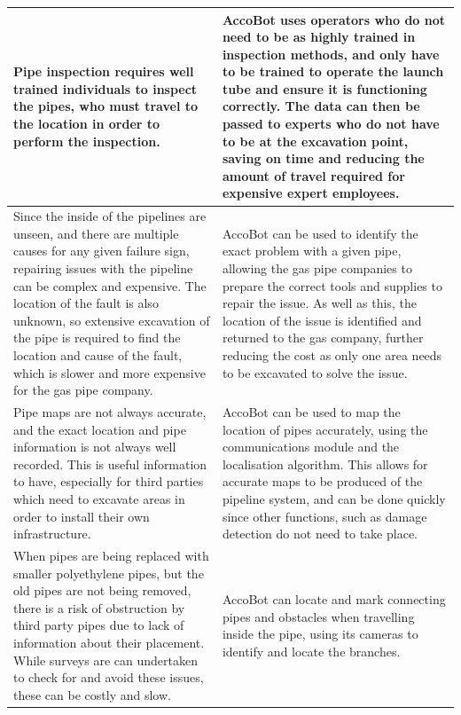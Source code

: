 \documentclass[11pt]{article}		%
\begin{document}
\begin{longtable}[c]{| m{} | m{} |}
			\\
			\hline
			\rowcolor{rowGrey}
			Pipe inspection requires well trained individuals to inspect the pipes, who must travel to the location in order to perform the inspection.
			& 
			AccoBot uses operators who do not need to be as highly trained in inspection methods, and only have to be trained to operate the launch tube and ensure it is functioning correctly.
			The data can then be passed to experts who do not have to be at the excavation point, saving on time and reducing the amount of travel required for expensive expert employees.
			\\
			\hline
			\rowcolor{rowGrey}
			Since the inside of the pipelines are unseen, and there are multiple causes for any given failure sign, repairing issues with the pipeline can be complex and expensive.
			The location of the fault is also unknown, so extensive excavation of the pipe is required to find the location and cause of the fault, which is slower and more expensive for the gas pipe company.
			& 
			AccoBot can be used to identify the exact problem with a given pipe, allowing the gas pipe companies to prepare the correct tools and supplies to repair the issue.
			As well as this, the location of the issue is identified and returned to the gas company, further reducing the cost as only one area needs to be excavated to solve the issue.
			\\
			\hline
			\rowcolor{rowGrey}
			Pipe maps are not always accurate, and the exact location and pipe information is not always well recorded.
			This is useful information to have, especially for third parties which need to excavate areas in order to install their own infrastructure.
			& 
			AccoBot can be used to map the location of pipes accurately, using the communications module and the localisation algorithm.
			This allows for accurate maps to be produced of the pipeline system, and can be done quickly since other functions, such as damage detection do not need to take place.
			\\
			\hline
			\rowcolor{rowGrey}
			When pipes are being replaced with smaller polyethylene pipes, but the old pipes are not being removed, there is a risk of obstruction by third party pipes due to lack of information about their placement.
			While surveys are can undertaken to check for and avoid these issues, these can be costly and slow.
			& 
			AccoBot can locate and mark connecting pipes and obstacles when travelling inside the pipe, using its cameras to identify and locate the branches.
			\\

\end{longtable}
\end{document}
